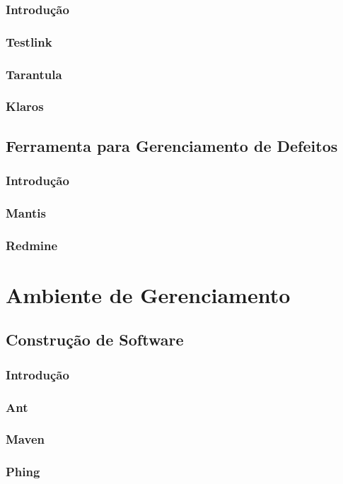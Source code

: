 \documentclass[12pt,a4paper]{article}
\begin{document}
		\subsubsection{Introdução}
		\subsubsection{Testlink}
		\subsubsection{Tarantula}
		\subsubsection{Klaros}
		
	\subsection{Ferramenta para Gerenciamento de Defeitos}
		\subsubsection{Introdução}
		\subsubsection{Mantis}
		\subsubsection{Redmine}

\clearpage		
\section{Ambiente de Gerenciamento}
	\subsection{Construção de Software}
		\subsubsection{Introdução}
		\subsubsection{Ant}
		\subsubsection{Maven}
		\subsubsection{Phing}
\end{document}
